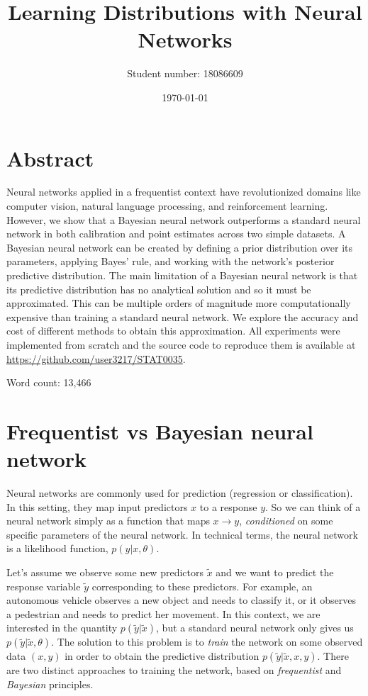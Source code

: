\documentclass[12pt]{article}
\title{Learning Distributions with Neural Networks}
\author{Student number: 18086609}
\date{\today}
\begin{document}
\maketitle

\vfill

\section*{Abstract}
Neural networks applied in a frequentist context have revolutionized domains like computer vision, natural language processing, and reinforcement learning. However, we show that a Bayesian neural network outperforms a standard neural network in both calibration and point estimates across two simple datasets. A Bayesian neural network can be created by defining a prior distribution over its parameters, applying Bayes' rule, and working with the network's posterior predictive distribution.  The main limitation of a Bayesian neural network is that its predictive distribution has no analytical solution and so it must be approximated. This can be multiple orders of magnitude more computationally expensive than training a standard neural network. We explore the accuracy and cost of different methods to obtain this approximation. All experiments were implemented from scratch and the source code to reproduce them is available at \url{https://github.com/user3217/STAT0035}.

\vfill

{\centering Word count: 13,466\par}

\vspace{2cm}
\newpage

\tableofcontents
\newpage

\section{Frequentist vs Bayesian neural network}
\label{sec_nn_vs_bnn}

Neural networks are commonly used for prediction (regression or classification). In this setting, they map input predictors $x$ to a response $y$. So we can think of a neural network simply as a function that maps $x \rightarrow y$, \textit{conditioned} on some specific parameters of the neural network. In technical terms, the neural network is a likelihood function, $p(y | x, \theta)$.

Let's assume we observe some new predictors $\tilde{x}$ and we want to predict the response variable $\tilde{y}$ corresponding to these predictors. For example, an autonomous vehicle observes a new object and needs to classify it, or it observes a pedestrian and needs to predict her movement. In this context, we are interested in the quantity $p(\tilde{y} | \tilde{x})$, but a standard neural network only gives us $p(\tilde{y} | \tilde{x}, \theta)$. The solution to this problem is to \textit{train} the network on some observed data $(x, y)$ in order to obtain the predictive distribution $p(\tilde{y} | \tilde{x}, x, y)$. There are two distinct approaches to training the network, based on \textit{frequentist} and \textit{Bayesian} principles.
\end{document}
